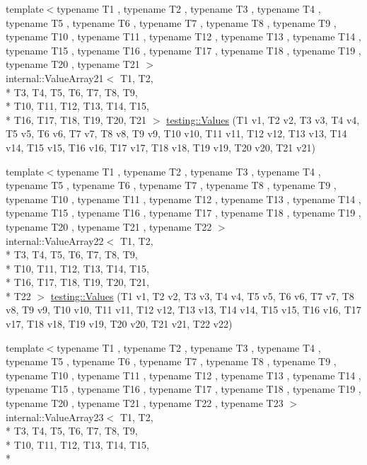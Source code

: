 \begin{DoxyCompactItemize}
\item 
{\footnotesize template$<$typename T1 , typename T2 , typename T3 , typename T4 , typename T5 , typename T6 , typename T7 , typename T8 , typename T9 , typename T10 , typename T11 , typename T12 , typename T13 , typename T14 , typename T15 , typename T16 , typename T17 , typename T18 , typename T19 , typename T20 , typename T21 $>$ }\\internal\-::\-Value\-Array21$<$ T1, T2, \\*
T3, T4, T5, T6, T7, T8, T9, \\*
T10, T11, T12, T13, T14, T15, \\*
T16, T17, T18, T19, T20, T21 $>$ \hyperlink{namespacetesting_a6f3b9661b48f2c663dbe5fcfb0720f5f}{testing\-::\-Values} (T1 v1, T2 v2, T3 v3, T4 v4, T5 v5, T6 v6, T7 v7, T8 v8, T9 v9, T10 v10, T11 v11, T12 v12, T13 v13, T14 v14, T15 v15, T16 v16, T17 v17, T18 v18, T19 v19, T20 v20, T21 v21)
\item 
{\footnotesize template$<$typename T1 , typename T2 , typename T3 , typename T4 , typename T5 , typename T6 , typename T7 , typename T8 , typename T9 , typename T10 , typename T11 , typename T12 , typename T13 , typename T14 , typename T15 , typename T16 , typename T17 , typename T18 , typename T19 , typename T20 , typename T21 , typename T22 $>$ }\\internal\-::\-Value\-Array22$<$ T1, T2, \\*
T3, T4, T5, T6, T7, T8, T9, \\*
T10, T11, T12, T13, T14, T15, \\*
T16, T17, T18, T19, T20, T21, \\*
T22 $>$ \hyperlink{namespacetesting_aadfff0d803156b98ff1ffa5f1d95c350}{testing\-::\-Values} (T1 v1, T2 v2, T3 v3, T4 v4, T5 v5, T6 v6, T7 v7, T8 v8, T9 v9, T10 v10, T11 v11, T12 v12, T13 v13, T14 v14, T15 v15, T16 v16, T17 v17, T18 v18, T19 v19, T20 v20, T21 v21, T22 v22)
\item 
{\footnotesize template$<$typename T1 , typename T2 , typename T3 , typename T4 , typename T5 , typename T6 , typename T7 , typename T8 , typename T9 , typename T10 , typename T11 , typename T12 , typename T13 , typename T14 , typename T15 , typename T16 , typename T17 , typename T18 , typename T19 , typename T20 , typename T21 , typename T22 , typename T23 $>$ }\\internal\-::\-Value\-Array23$<$ T1, T2, \\*
T3, T4, T5, T6, T7, T8, T9, \\*
T10, T11, T12, T13, T14, T15, \\*

\end{DoxyCompactItemize}
